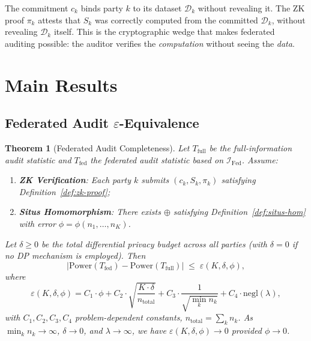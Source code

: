 \documentclass[12pt,a4paper]{article}
\newtheorem{theorem}{Theorem}[section]
\newcommand{\cD}{\mathcal{D}}
\newcommand{\cI}{\mathcal{I}}
\newcommand{\ZK}{\mathrm{ZK}}
\begin{document}
The commitment $c_k$ binds party $k$ to its dataset $\cD_k$ without revealing
it.  The $\ZK$ proof $\pi_k$ attests that $S_k$ was correctly computed from
the committed $\cD_k$, without revealing $\cD_k$ itself.  This is the
cryptographic wedge that makes federated auditing possible: the auditor
verifies the \emph{computation} without seeing the \emph{data}.

\section{Main Results}

\subsection{Federated Audit $\varepsilon$-Equivalence}

\begin{theorem}[Federated Audit Completeness]
\label{thm:fed-equiv}
Let $T_{\mathrm{full}}$ be the full-information audit statistic and
$T_{\mathrm{fed}}$ the federated audit statistic based on
$\cI_{\mathrm{Fed}}$.  Assume:
\begin{enumerate}[label=(\alph*)]
    \item \textbf{ZK Verification}: Each party $k$ submits
          $(c_k, S_k, \pi_k)$ satisfying Definition~\ref{def:zk-proof};
    \item \textbf{Situs Homomorphism}: There exists $\oplus$ satisfying
          Definition~\ref{def:situs-hom} with error
          $\phi = \phi(n_1, \dots, n_K)$.
\end{enumerate}
Let $\delta \geq 0$ be the total differential privacy budget across all
parties (with $\delta = 0$ if no DP mechanism is employed).  Then
\begin{equation}\label{eq:fed-equiv-bound}
    \big|\mathrm{Power}(T_{\mathrm{fed}}) - \mathrm{Power}(T_{\mathrm{full}})\big|
    \;\leq\; \varepsilon(K, \delta, \phi),
\end{equation}
where
\begin{equation}\label{eq:epsilon-def}
    \varepsilon(K, \delta, \phi) =
    C_1 \cdot \phi
    + C_2 \cdot \sqrt{\frac{K \cdot \delta}{n_{\mathrm{total}}}}
    + C_3 \cdot \frac{1}{\sqrt{\min_k n_k}}
    + C_4 \cdot \mathrm{negl}(\lambda),
\end{equation}
with $C_1, C_2, C_3, C_4$ problem-dependent constants,
$n_{\mathrm{total}} = \sum_k n_k$.  As $\min_k n_k \to \infty$,
$\delta \to 0$, and $\lambda \to \infty$, we have
$\varepsilon(K, \delta, \phi) \to 0$ provided $\phi \to 0$.
\end{theorem}
\end{document}
